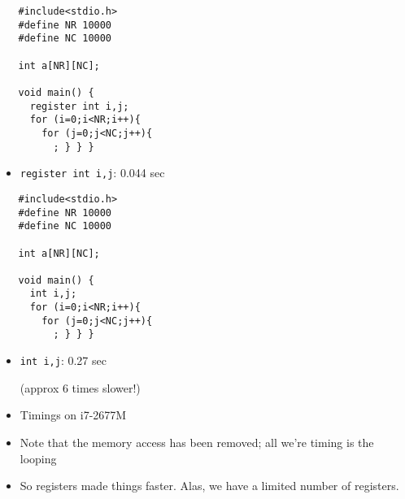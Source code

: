 \begin{frame}[fragile]

\begin{multicols}{2}
\begin{verbatim}
   #include<stdio.h> 
   #define NR 10000 
   #define NC 10000 

   int a[NR][NC]; 

   void main() { 
     register int i,j; 
     for (i=0;i<NR;i++){ 
       for (j=0;j<NC;j++){ 
         ; } } }
\end{verbatim}
\begin{itemize}
\item \texttt{register int i,j}: 0.044 sec 
\end{itemize}
\columnbreak
\begin{verbatim}
   #include<stdio.h> 
   #define NR 10000 
   #define NC 10000 

   int a[NR][NC]; 

   void main() { 
     int i,j; 
     for (i=0;i<NR;i++){ 
       for (j=0;j<NC;j++){ 
         ; } } }
\end{verbatim}

\begin{itemize}
\item \texttt{int i,j}: 0.27 sec 

	(approx 6 times slower!)
\end{itemize}

\end{multicols}
\BNotes\ifnum{}
\begin{itemize}
\item Timings on i7-2677M
\item Note that the memory access has been removed; all we're timing is
	the looping
\item So registers made things faster.  Alas, we have a limited number
	of registers.
\end{itemize}
\fi\ENotes
\end{frame}






